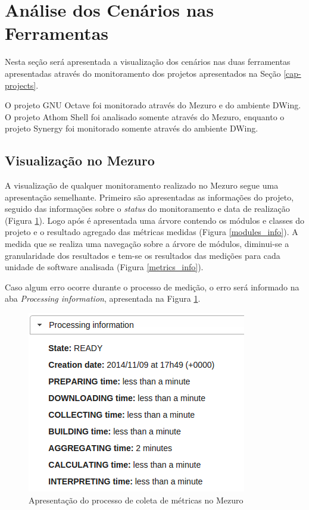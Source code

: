 \section{Análise dos Cenários nas Ferramentas}

Nesta seção será apresentada a visualização dos cenários nas duas ferramentas apresentadas através do monitoramento dos projetos apresentados na Seção \ref{cap-projects}.

O projeto GNU Octave foi monitorado através do Mezuro e do ambiente DWing. O projeto Athom Shell foi analisado somente através do Mezuro, enquanto o projeto Synergy foi monitorado somente através do ambiente DWing.

\subsection{Visualização no Mezuro}
\label{vision-mezuro}

A visualização de qualquer monitoramento realizado no Mezuro segue uma apresentação semelhante. Primeiro são apresentadas as informações do projeto, seguido das informações sobre o \emph{status} do monitoramento e data de realização (Figura \ref{proc_info}). Logo após é apresentada uma árvore contendo os módulos e classes do projeto e o resultado agregado das métricas medidas  (Figura \ref{modules_info}). A medida que se realiza uma navegação sobre a árvore de módulos, diminui-se a granularidade dos resultados e tem-se os resultados das medições para cada unidade de software analisada (Figura \ref{metrics_info}).

Caso algum erro ocorre durante o processo de medição, o erro será informado na aba \emph{Processing information}, apresentada na Figura \ref{proc_info}. 

\begin{figure}[H]
	\centering
		\includegraphics[scale=0.5]{figuras/proc_info}
		\caption{Apresentação do processo de coleta de métricas no Mezuro}
		\label{proc_info}
\end{figure}


